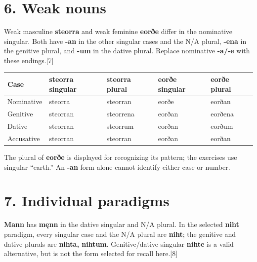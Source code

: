 \section*{6. Weak nouns}

Weak masculine \textbf{steorra} and weak feminine \textbf{eorðe} differ in the nominative singular. Both have \textbf{-an} in the other singular cases and the N/\allowbreak{}A plural, \textbf{-ena} in the genitive plural, and \textbf{-um} in the dative plural. Replace nominative \textbf{-a/\allowbreak{}-e} with these endings.[7]

\par\begingroup
\fontsize{10.5}{13.2}\selectfont
\setlength{\LTleft}{0pt}\setlength{\LTright}{\fill}
\noindent
\begin{tabular}{@{}>{\raggedright\arraybackslash}p{22.0mm}>{\raggedright\arraybackslash}p{22.688mm}>{\raggedright\arraybackslash}p{22.688mm}>{\raggedright\arraybackslash}p{22.688mm}>{\raggedright\arraybackslash}p{22.688mm}@{}}
\toprule
\textbf{Case} & \textbf{steorra singular} & \textbf{steorra plural} & \textbf{eorðe singular} & \textbf{eorðe plural} \\
\midrule
Nominative & steorra & steorran & eorðe & eorðan \\
Genitive & steorran & steorrena & eorðan & eorðena \\
Dative & steorran & steorrum & eorðan & eorðum \\
Accusative & steorran & steorran & eorðan & eorðan \\
\bottomrule
\end{tabular}
\par\endgroup

The plural of \textbf{eorðe} is displayed for recognizing its pattern; the exercises use singular “earth.” An \textbf{-an} form alone cannot identify either case or number.

\section*{7. Individual paradigms}

\textbf{Mann} has \textbf{męnn} in the dative singular and N/\allowbreak{}A plural. In the selected \textbf{niht} paradigm, every singular case and the N/\allowbreak{}A plural are \textbf{niht}; the genitive and dative plurals are \textbf{nihta, nihtum}. Genitive/\allowbreak{}dative singular \textbf{nihte} is a valid alternative, but is not the form selected for recall here.[8]

